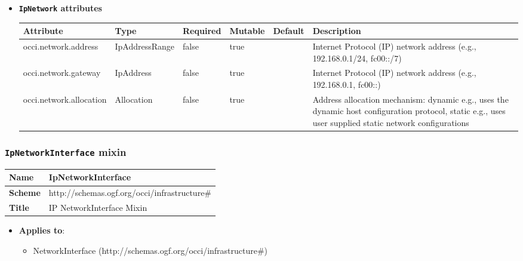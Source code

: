 \begin{itemize}
\item \textbf{\texttt{IpNetwork} attributes}

\begin{tabularx}{\textwidth}{|l|l|p{1.4cm}|p{1.3cm}|l|X|}
  \hline
  \textbf{Attribute} & \textbf{Type} & \textbf{Required} & \textbf{Mutable} & \textbf{Default} & \textbf{Description} \\
  \hline  
  occi.network.address & IpAddressRange & false & true &  & Internet Protocol (IP) network address (e.g., 192.168.0.1/24, fc00::/7) \\
  \hline
  occi.network.gateway & IpAddress & false & true &  & Internet Protocol (IP) network address (e.g., 192.168.0.1, fc00::) \\
  \hline
  occi.network.allocation & Allocation & false & true &  & Address allocation mechanism: dynamic e.g., uses the dynamic host configuration protocol, static e.g., uses user supplied static network configurations \\
  \hline
\end{tabularx}
\end{itemize}


 
\subsubsection{\texttt{IpNetworkInterface} mixin}
\begin{center}
\begin{tabular}{|l|l|}
  \hline
  \textbf{Name} & IpNetworkInterface \\
  \hline  
  \textbf{Scheme} & http://schemas.ogf.org/occi/infrastructure\# \\
  \hline
  \textbf{Title} & IP NetworkInterface Mixin \\
  \hline
\end{tabular}
\end{center}
\begin{itemize}
\item \textbf{Applies to}:
\begin{itemize}
	\item NetworkInterface (http://schemas.ogf.org/occi/infrastructure\#)
\end{itemize}
\end{itemize} 

